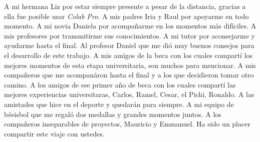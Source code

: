 \begin{acknowledgements}
     A mi hermana Liz por estar siempre presente a pesar de la distancia, gracias a ella fue posible usar \textit{Colab Pro}. A mis padres Iria y Raul por apoyarme en todo momento. A mi novia Daniela por acompa\~narme en los momentos m\'as dif\'iciles. A mis profesores por transmitirme sus conocimientos. A mi tutor por aconsejarme y ayudarme hasta el final. Al profesor Daniel que me di\'o muy buenos consejos para el desarrollo de este trabajo. A mis amigos de la beca con los cuales compart\'i los mejores momentos de esta etapa universitaria, son muchos para mencionar. A mis compa\~neros que me acompan\~aron hasta el final y a los que decidieron tomar otro camino. A los amigos de ese primer a\~no de beca con los cuales compart\'i las mejores experiencias universitaras, Carlos, Ramel, Cesar, el Pichi, Ronaldo. A las amistades que hice en el deporte y quedar\'an para siempre. A mi equipo de b\'eeisbol que me regal\'o dos medallas y grandes momentos juntos. A los compa\~neros inseparables de proyectos, Mauricio y Emmanuel. Ha sido un placer compartir este viaje con ustedes. 

\end{acknowledgements}